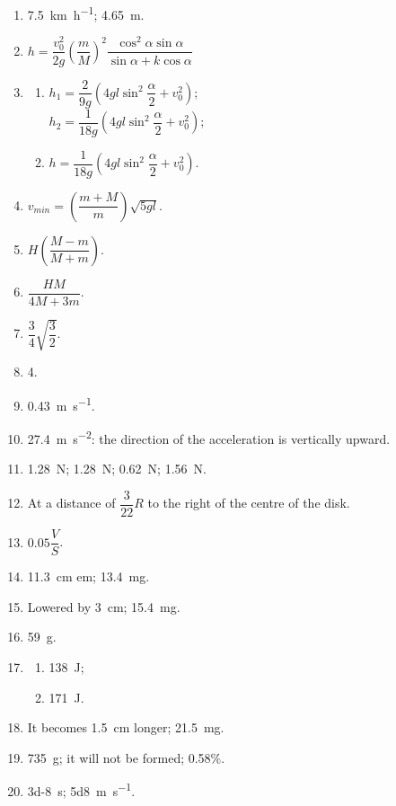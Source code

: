 \documentclass[a4paper,sfsidenotes]{tufte-book}
\begin{document}
\begin{enumerate}[label=\arabic*.]
\item \SI[per-mode=symbol]{7.5}{\kilo\metre\per\hour}; \SI{4.65}{\metre}.
\item $h = \dfrac{v_{0}^{2}}{2g} \left( \dfrac{m}{M}\right)^{2} \dfrac{\cos^{2} \alpha \sin \alpha}{\sin \alpha + k \cos \alpha}$
\item 
\begin{enumerate}[label=(\arabic*)]
\item $h_{1} = \dfrac{2}{9g} \left( 4gl \sin^{2} \dfrac{\alpha}{2} + v_{0}^{2}\right);$\\
$h_{2} = \dfrac{1}{18g} \left( 4gl \sin^{2} \dfrac{\alpha}{2} + v_{0}^{2}\right);$
\item $h = \dfrac{1}{18g} \left( 4gl \sin^{2} \dfrac{\alpha}{2} + v_{0}^{2}\right)$.
\end{enumerate}
\item $v_{min} = \left( \dfrac{m+M}{m} \right) \sqrt{5gl}$.
\item $H \left( \dfrac{M-m}{M+m} \right)$.
\item $\dfrac{HM}{4M+3m}$.
\item $\dfrac{3}{4} \sqrt{\dfrac{3}{2}}$.
\item 4.
\item \SI[per-mode=symbol]{0.43}{\metre\per\second}.
\item \SI[per-mode=symbol]{27.4}{\metre\per\second\squared}: the direction of the acceleration is vertically upward.
\item \SI{1.28}{\newton}; \SI{1.28}{\newton}; \SI{0.62}{\newton}; \SI{1.56}{\newton}.
\item At a distance of $\dfrac{3}{22}R$ to the right of the centre of the disk.
\item $0.05 \dfrac{V}{S}$.
\item  \SI{11.3}{\centi\metre} em; \SI{13.4}{\milli\gram}.
\item Lowered by \SI{3}{\centi\metre}; \SI{15.4}{\milli\gram}.
\item \SI{59}{\gram}.
\item 
\begin{enumerate}[label=(\arabic*)]
\item \SI{138}{\joule};
\item  \SI{171}{\joule}.
\end{enumerate}
\item It becomes \SI{1.5}{\centi\metre} longer; \SI{21.5}{\milli\gram}.
\item \SI{735}{\gram}; it will not be formed; 0.58\%.
\item \SI{3d-8}{\second}; \SI[per-mode=symbol]{5d8}{\metre\per\second}.

\end{enumerate}
\end{document}
